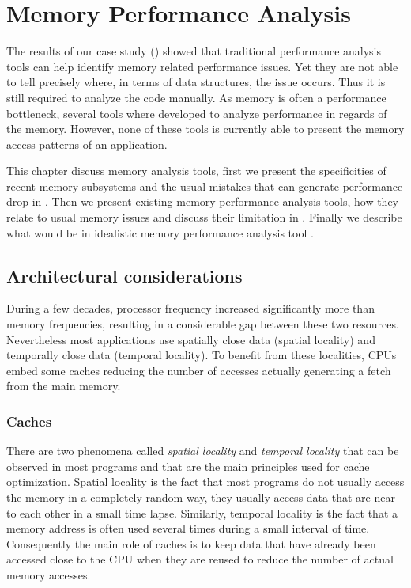 \chapter{Memory Performance Analysis}
\label{chap:mem}

The results of our case study () showed that traditional performance analysis tools can help identify memory related performance issues.
Yet they are not able to tell precisely where, in terms of data structures, the issue occurs.
Thus it is still required to analyze the code manually.
As memory is often a performance bottleneck, several tools where developed to analyze performance in regards of the memory.
However, none of these tools is currently able to present the memory access patterns of an application.

This chapter discuss memory analysis tools, first we present the specificities of recent memory subsystems and the usual mistakes that can generate performance drop in .
Then we present existing memory performance analysis tools, how they relate to usual memory issues and discuss their limitation in .
Finally we describe what would be in idealistic memory performance analysis tool .

\section{Architectural considerations}
\label{sec:archi}

During a few decades, processor frequency increased significantly more than memory frequencies, resulting in a considerable gap between these two resources.
Nevertheless most applications use spatially close data (spatial locality) and temporally close data (temporal locality).
To benefit from these localities, \glspl{CPU} embed some caches reducing the number of accesses actually generating a fetch from the main memory.

\subsection{Caches}

There are two phenomena called \emph{spatial locality} and \emph{temporal locality} that can be observed in most programs and that are the main principles used for cache optimization.
Spatial locality is the fact that most programs do not usually access the memory in a completely random way, they usually access data that are near to each other in a small time lapse.
Similarly, temporal locality is the fact that a memory address is often used several times during a small interval of time.
Consequently the main role of caches is to keep data that have already been accessed close to the \gls{CPU} when they are reused to reduce the number of actual memory accesses.

